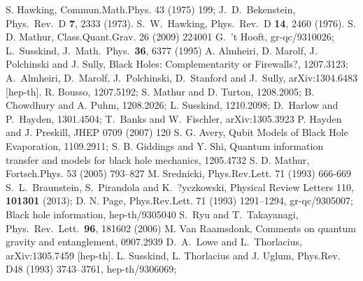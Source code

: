 \documentclass[12pt,aps,prd,onecolumn,nofootinbib,superscriptaddress,amssymb]{revtex4-1}
\begin{document}
\begin{thebibliography}{99}
 S. Hawking, %
Commun.Math.Phys. 43 (1975) 199;   J.~D.~Bekenstein, %
 Phys.\ Rev.\ D {\bf 7}, 2333 (1973).
   S.~W.~Hawking,
  Phys.\ Rev.\ D {\bf 14}, 2460 (1976).
    S. D. Mathur, %
 Class.Quant.Grav. 26 (2009) 224001%
  G.~'t Hooft,   gr-qc/9310026;  L.~Susskind,   J.\ Math.\ Phys.\  {\bf 36}, 6377 (1995) 
 A. Almheiri, D. Marolf, J. Polchinski and J. Sully, Black Holes: Complementarity or Firewalls?, 1207.3123;
 A.~Almheiri, D.~Marolf, J.~Polchinski, D.~Stanford and J.~Sully,
    arXiv:1304.6483 [hep-th].
R. Bousso, 1207.5192;
S. Mathur and D. Turton,   1208.2005;
B. Chowdhury and A. Puhm, 1208.2026;  
L. Susskind,  1210.2098; D.~Harlow and P.~Hayden, 1301.4504; T.~Banks and W.~Fischler,
 arXiv:1305.3923 
  P. Hayden and J. Preskill, %
JHEP 0709 (2007) 120
         S. G. Avery, Qubit Models of Black Hole Evaporation, 1109.2911;
S. B. Giddings and Y. Shi, Quantum information transfer and models for black hole mechanics, 1205.4732
        S. D. Mathur,  Fortsch.Phys. 53 (2005) 793--827
   M. Srednicki, Phys.Rev.Lett. 71 (1993) 666-669
  S.~L.~Braunstein, S.~Pirandola and K.~?yczkowski,
  Physical Review Letters 110, {\bf 101301} (2013);
          D. N. Page, %
Phys.Rev.Lett. 71 (1993) 1291--1294, gr-qc/9305007; Black hole information, hep-th/9305040
 S.~Ryu and T.~Takayanagi,
  Phys.\ Rev.\ Lett.\  {\bf 96}, 181602 (2006)
  M. Van Raamsdonk, Comments on quantum gravity and entanglement, 0907.2939%
  D.~A.~Lowe and L.~Thorlacius,
  arXiv:1305.7459 [hep-th].
  L. Susskind, L. Thorlacius and J. Uglum, Phys.Rev. D48 (1993) 3743--3761, hep-th/9306069;

\end{thebibliography}
\end{document}
